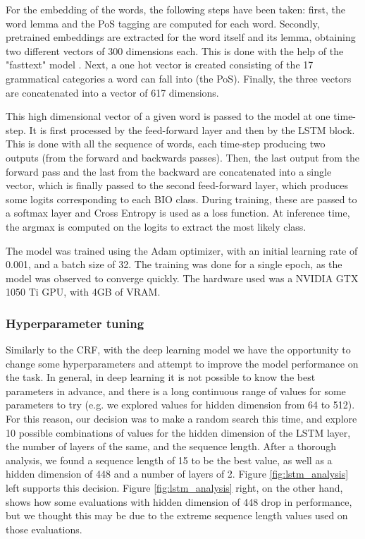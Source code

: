\documentclass{article}
\begin{document}
For the embedding of the words, the following steps have been taken: first, the word lemma and the PoS
tagging are computed for each word. Secondly, pretrained embeddings are extracted for the word itself and its
lemma, obtaining two different vectors of 300 dimensions each. This is done with the help of the "fasttext" model
\cite{joulin2016bag} \cite{joulin2016fasttext}. Next, a one hot vector is created consisting of the 17 grammatical
categories a word can fall into (the PoS). Finally, the three vectors are concatenated into a vector of 617 dimensions.

This high dimensional vector of a given word is passed to the model at one time-step. It is first processed by
the feed-forward layer and then by the LSTM block. This is done with all the sequence of words, each time-step
producing two outputs (from the forward and backwards passes). Then, the last output from the forward pass and
the last from the backward are concatenated into a single vector, which is finally passed to the second
feed-forward layer, which produces some logits corresponding to each BIO class. During training, these are passed
to a softmax layer and Cross Entropy is used as a loss function. At inference time, the argmax is computed on the
logits to extract the most likely class.

The model was trained using the Adam optimizer, with an initial learning rate of 0.001, and a batch size of 32.
The training was done for a single epoch, as the model was observed to converge quickly. The hardware used was a
NVIDIA GTX 1050 Ti GPU, with 4GB of VRAM.

\subsubsection*{Hyperparameter tuning}
Similarly to the CRF, with the deep learning model we have the opportunity to change some hyperparameters and attempt
to improve the model performance on the task. In general, in deep learning it is not possible to know the best
parameters in advance, and there is a long continuous range of values for some parameters to try (e.g. we explored
values for hidden dimension from 64 to 512). For this reason, our decision was to make a random search this time,
and explore 10 possible combinations of values for the hidden dimension of the LSTM layer, the number of layers of
the same, and the sequence length. After a thorough analysis, we found a sequence length of 15 to be the best value,
as well as a hidden dimension of 448 and a number of layers of 2. Figure \ref{fig:lstm_analysis} left supports this decision.
Figure \ref{fig:lstm_analysis} right, on the other hand, shows how some evaluations with hidden dimension of 448 drop in
performance, but we thought this may be due to the extreme sequence length values used on those evaluations.
\end{document}

